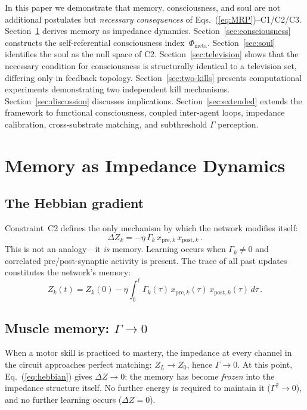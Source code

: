 \documentclass[aps,pre,twocolumn,superscriptaddress,floatfix]{revtex4-2}
\newcommand{\Phimeta}{\Phi_{\text{meta}}}
\begin{document}
In this paper we demonstrate that memory, consciousness, and
soul are not additional postulates but \emph{necessary
consequences} of Eqs.~(\ref{eq:MRP})--C1/C2/C3.
Section~\ref{sec:memory} derives memory as impedance dynamics.
Section~\ref{sec:consciousness} constructs the
self-referential consciousness index~$\Phimeta$.
Section~\ref{sec:soul} identifies the soul as the null space
of C2.
Section~\ref{sec:television} shows that the necessary
condition for consciousness is structurally identical to a
television set, differing only in feedback topology.
Section~\ref{sec:two-kills} presents computational experiments
demonstrating two independent kill mechanisms.
Section~\ref{sec:discussion} discusses implications.
Section~\ref{sec:extended} extends the framework to
functional consciousness, coupled inter-agent loops,
impedance calibration, cross-substrate matching, and
subthreshold $\Gamma$ perception.


\section{Memory as Impedance Dynamics}
\label{sec:memory}

\subsection{The Hebbian gradient}

Constraint~C2 defines the only mechanism by which the network
modifies itself:
\begin{equation}
  \Delta Z_k = -\eta\,\Gamma_k\,x_{\text{pre},k}\,x_{\text{post},k}\,.
  \label{eq:hebbian}
\end{equation}
This is not an analogy---it \emph{is} memory.
Learning occurs when $\Gamma_k\neq 0$ and correlated
pre/post-synaptic activity is present.
The trace of all past updates constitutes the network's
memory:
\begin{equation}
  Z_k(t) = Z_k(0) - \eta \int_0^t
    \Gamma_k(\tau)\,x_{\text{pre},k}(\tau)\,
    x_{\text{post},k}(\tau)\,d\tau\,.
  \label{eq:memory-integral}
\end{equation}

\subsection{Muscle memory: $\Gamma\to 0$}

When a motor skill is practiced to mastery, the impedance at
every channel in the circuit approaches perfect matching:
$Z_L\to Z_0$, hence $\Gamma\to 0$.
At this point, Eq.~(\ref{eq:hebbian}) gives $\Delta Z\to 0$:
the memory has become \emph{frozen} into the impedance
structure itself.
No further energy is required to maintain it ($\Gamma^2\to 0$),
and no further learning occurs ($\Delta Z=0$).
\end{document}
